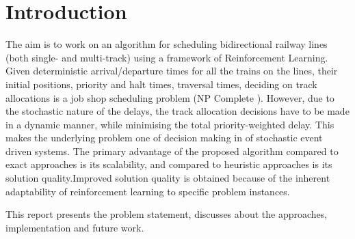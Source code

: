 \titleformat{\chapter}[display]{\normalfont\Large\bfseries}{}{11pt}{\Huge}
\chapter{Introduction}
\hspace{3mm}


The aim is to work on an algorithm for scheduling
bidirectional railway lines (both single- and multi-track) using a
framework of Reinforcement Learning. Given deterministic arrival/departure times for
 all the trains on the lines, their initial positions, 
 priority and halt times, traversal times, deciding on track allocations is a 
 job shop scheduling problem (NP Complete ). However, 
 due to the stochastic nature of the delays, 
 the track allocation decisions have to be made in a dynamic manner, 
 while minimising the total priority-weighted delay. 
 This makes the underlying problem one of decision making in of 
 stochastic event driven systems. 
The
primary advantage of the proposed algorithm compared to
exact approaches is its scalability, and compared to heuristic
approaches is its solution quality.Improved solution quality is obtained because
of the inherent adaptability of reinforcement learning to specific
problem instances.

\vspace{\baselineskip}
This report presents the problem statement, discusses about the approaches, implementation  
and future work.
